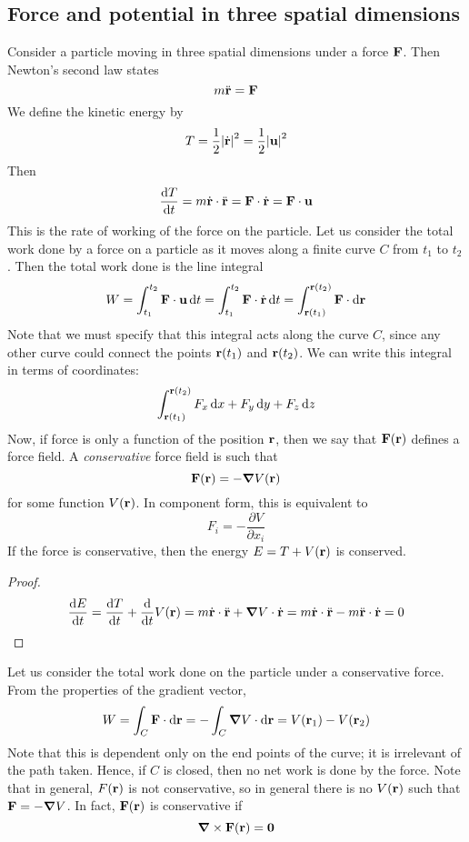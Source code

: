 \subsection{Force and potential in three spatial dimensions}
Consider a particle moving in three spatial dimensions under a force \(\vb F\).
Then Newton's second law states
\[
	m \ddot {\vb r} = \vb F
\]
We define the kinetic energy by
\[
	T = \frac{1}{2}\abs{\dot {\vb r}}^2 = \frac{1}{2}\abs{\vb u}^2
\]
Then
\[
	\frac{\dd{T}}{\dd{t}} = m \dot {\vb r} \cdot \ddot {\vb r} = \vb F \cdot \dot{\vb r} = \vb F \cdot \vb u
\]
This is the rate of working of the force on the particle.
Let us consider the total work done by a force on a particle as it moves along a finite curve \(C\) from \(t_1\) to \(t_2\).
Then the total work done is the line integral
\[
	W = \int_{t_1}^{t_2} \vb F \cdot \vb u \dd{t}
	= \int_{t_1}^{t_2} \vb F \cdot \dot {\vb r} \dd{t}
	= \int_{\vb r(t_1)}^{\vb r(t_2)} \vb F \cdot \dd \vb r
\]
Note that we must specify that this integral acts along the curve \(C\), since any other curve could connect the points \(\vb r(t_1)\) and \(\vb r(t_2)\).
We can write this integral in terms of coordinates:
\[
	\int_{\vb r(t_1)}^{\vb r(t_2)} F_x \dd{x} + F_y \dd{y} + F_z \dd{z}
\]
Now, if force is only a function of the position \(\vb r\), then we say that \(\vb F(\vb r)\) defines a force field.
A \textit{conservative} force field is such that
\[
	\vb F(\vb r) = -\grad V(\vb r)
\]
for some function \(V(\vb r)\).
In component form, this is equivalent to
\[
	F_i = -\frac{\partial V}{\partial x_i}
\]
If the force is conservative, then the energy \(E = T + V(\vb r)\) is conserved.
\begin{proof}
	\[
		\frac{\dd{E}}{\dd{t}} = \frac{\dd{T}}{\dd{t}} + \frac{\dd}{\dd{t}}V(\vb r) = m \dot{\vb r} \cdot \ddot{\vb r} + \grad V \cdot \dot{\vb r} = m\dot{\vb r} \cdot \ddot{\vb r} - m\ddot{\vb r} \cdot \dot{\vb r} = 0
	\]
\end{proof}
\noindent Let us consider the total work done on the particle under a conservative force.
From the properties of the gradient vector,
\[
	W = \int_C \vb F \cdot \dd \vb r = -\int_C \grad V \cdot \dd \vb r = V(\vb r_1) - V(\vb r_2)
\]
Note that this is dependent only on the end points of the curve; it is irrelevant of the path taken.
Hence, if \(C\) is closed, then no net work is done by the force.
Note that in general, \(F(\vb r)\) is not conservative, so in general there is no \(V(\vb r)\) such that \(\vb F = -\grad V\).
In fact, \(\vb F(\vb r)\) is conservative if
\[
	\grad \times \vb F(\vb r) = \vb 0
\]
